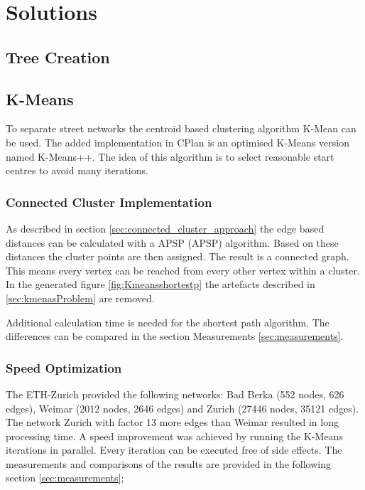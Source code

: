 \pagebreak
\section{Solutions}

\subsection{Tree Creation}


\subsection{K-Means}
To separate street networks the centroid based clustering algorithm K-Mean can be used. The added implementation in CPlan \citep{cPlan:2015} is an optimised K-Means version named K-Means++. The idea of this algorithm is to select reasonable start centres to avoid many iterations.

\subsubsection{Connected Cluster Implementation} \label{sec:K-Means_shortest_path}
As described in section \ref{sec:connected_cluster_approach} the edge based distances can be calculated with a \acrlong{APSP} (\acrshort{APSP}) algorithm. Based on these distances the cluster points are then assigned. The result is a connected graph. This means every vertex can be reached from every other vertex within a cluster. In the generated figure \ref{fig:Kmeansshortestp} the artefacts described in \ref{sec:kmenasProblem} are removed.

Additional calculation time is needed for the shortest path algorithm. The differences can be compared in the section Measurements \ref{sec:measurements}.

\subsubsection{Speed Optimization}
The ETH-Zurich provided the following networks: Bad Berka (552 nodes, 626 edges), Weimar (2012 nodes, 2646 edges) and Zurich (27446 nodes, 35121 edges). The network Zurich with factor 13 more edges than Weimar resulted in long processing time. A speed improvement was  achieved by running the K-Means iterations in parallel. Every iteration can be executed free of side effects. The measurements and comparisons of the results are provided in the following section \ref{sec:measurements};
